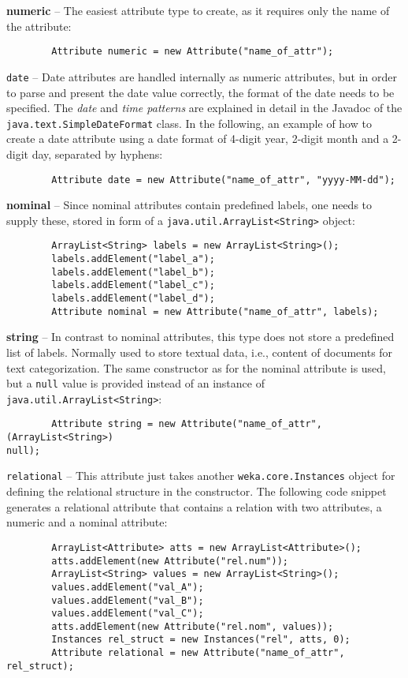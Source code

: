 \begin{tight_itemize}
	\item \textbf{numeric} -- The easiest attribute type to create, as it
requires only the name of the attribute:
	\begin{verbatim}
		Attribute numeric = new Attribute("name_of_attr");
	\end{verbatim}

	\item \texttt{date} -- Date attributes are handled internally as numeric
attributes, but in order to parse and present the date value correctly, the
format of the date needs to be specified. The \textit{date} and \textit{time
patterns} are explained in detail in the Javadoc of the
\texttt{java.text.SimpleDateFormat} class. In the following, an example of how
to create a date attribute using a date format of 4-digit year, 2-digit month
and a 2-digit day, separated by hyphens:
	\begin{verbatim}
		Attribute date = new Attribute("name_of_attr", "yyyy-MM-dd");
	\end{verbatim}

	\item \textbf{nominal} -- Since nominal attributes contain predefined
labels, one needs to supply these, stored in form of a
\texttt{java.util.ArrayList<String>} object:
	\begin{verbatim}
		ArrayList<String> labels = new ArrayList<String>();
		labels.addElement("label_a");
		labels.addElement("label_b");
		labels.addElement("label_c");
		labels.addElement("label_d");
		Attribute nominal = new Attribute("name_of_attr", labels);
	\end{verbatim}

	\item \textbf{string} -- In contrast to nominal attributes, this type does
not store a predefined list of labels. Normally used to store textual data,
i.e., content of documents for text categorization. The same constructor as for
the nominal attribute is used, but a \texttt{null} value is provided instead of
an instance of \texttt{java.util.ArrayList<String>}:
	\begin{verbatim}
		Attribute string = new Attribute("name_of_attr", (ArrayList<String>)
null);
	\end{verbatim}

	\newpage

	\item \texttt{relational} -- This attribute just takes another
\texttt{weka.core.Instances} object for defining the relational structure in
the constructor. The following code snippet generates a relational attribute
that contains a relation with two attributes, a numeric and a nominal attribute:
	\begin{verbatim}
		ArrayList<Attribute> atts = new ArrayList<Attribute>();
		atts.addElement(new Attribute("rel.num"));
		ArrayList<String> values = new ArrayList<String>();
		values.addElement("val_A");
		values.addElement("val_B");
		values.addElement("val_C");
		atts.addElement(new Attribute("rel.nom", values));
		Instances rel_struct = new Instances("rel", atts, 0);
		Attribute relational = new Attribute("name_of_attr", rel_struct);
	\end{verbatim}
\end{tight_itemize}
